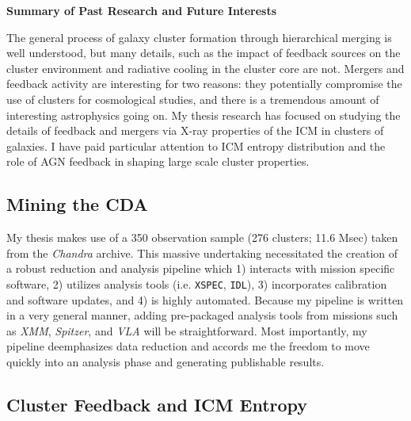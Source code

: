 \documentclass[11pt]{article}
\begin{document}
\begin{center}
\textbf{Summary of Past Research and Future Interests}\\
\end{center}

The general process of galaxy cluster formation through hierarchical
merging is well understood, but many details, such as the impact of
feedback sources on the cluster environment and radiative cooling in
the cluster core are not. Mergers and feedback activity are interesting for
two reasons: they potentially compromise the use of clusters for
cosmological studies, and there is a tremendous amount of interesting
astrophysics going on. My thesis research has focused on studying
the details of feedback and mergers via X-ray properties of the ICM in
clusters of galaxies. I have paid particular attention to ICM entropy
distribution and the role of AGN feedback in shaping large scale
cluster properties.

\subsection*{Mining the CDA}

My thesis makes use of a 350 observation sample (276 clusters; 11.6
Msec) taken from the {\it Chandra} archive. This massive
undertaking necessitated the creation of a robust reduction and
analysis pipeline which 1) interacts with mission specific software,
2) utilizes analysis tools (i.e. {\tt{XSPEC}}, {\tt{IDL}}), 3)
incorporates calibration and software updates, and 4) is highly
automated. Because my pipeline is written in a very general manner,
adding pre-packaged analysis tools from missions such as
{\textit{XMM}}, {\textit{Spitzer}}, and {\textit{VLA}} will be
straightforward. Most importantly, my pipeline deemphasizes data
reduction and accords me the freedom to move quickly into an analysis
phase and generating publishable results.

\subsection*{Cluster Feedback and ICM Entropy}
\end{document}
